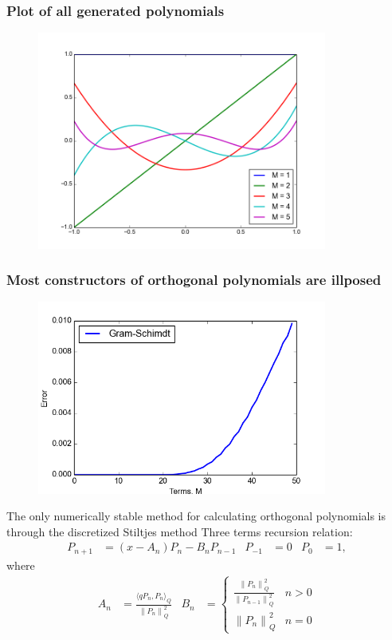\documentclass{beamer}
\newcommand{\norm}[1]{\left\lVert#1\right\rVert_{\!Q}}
\begin{document}
\begin{frame}
 \frametitle{Plot of all generated polynomials}
  \begin{figure}
    \includegraphics[width=0.85\textwidth]{gramschmidtpoly.png}
  \end{figure}
\end{frame}


\begin{frame}
 \frametitle{Most constructors of orthogonal polynomials are
 illposed}
     \begin{figure}
    \includegraphics[width=0.85\textwidth]{gramschmidterror1.png}
  \end{figure}
  
 \end{frame}


\begin{frame}
 {The only numerically stable method for
 calculating orthogonal polynomials is through the discretized
 Stiltjes method}
 \pause
 Three terms recursion relation:
 \begin{align*}
     P_{n+1} &= (x-A_n) P_n - B_n P_{n-1} &
     P_{-1} &= 0 & P_0 &= 1,
 \end{align*}
    \pause
   where
   \begin{align*}
   A_n &= \frac{\langle qP_n,P_n\rangle_Q}{\norm{P_n}^2}
   &
  B_n &= 
  \begin{cases}
  \frac{\norm{P_n}^2}{\norm{P_{n-1}}^2} & n > 0\\
  \norm{P_n}^2 & n = 0
  \end{cases}
   \end{align*}
  \end{frame}
\end{document}
